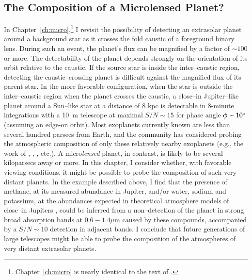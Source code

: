 \subsection[The Composition of a Microlensed Planet?]{The Composition of a Microlensed Planet?}
\label{intro_ssec:micro}
In Chapter~\ref{ch:micro},\footnote{Chapter~\ref{ch:micro} is nearly
identical to the text of \citet{spiegel_et_al2005}.} I revisit the
possibility of detecting an extrasolar planet around a background star
as it crosses the fold caustic of a foreground binary lens.  During
such an event, the planet's flux can be magnified by a factor of $\sim
100$ or more.  The detectability of the planet depends strongly on the
orientation of its orbit relative to the caustic.  If the source star
is inside the inter--caustic region, detecting the caustic--crossing
planet is difficult against the magnified flux of its parent star.  In
the more favorable configuration, when the star is outside the
inter--caustic region when the planet crosses the caustic, a close--in
Jupiter--like planet around a Sun--like star at a distance of 8 kpc is
detectable in 8-minute integrations with a 10~m telescope at maximal
$S/N\sim15$ for phase angle $\phi\sim10\mbox{$^\circ$}$ (assuming an edge-on
orbit).  Most exoplanets currently known are less than several hundred
parsecs from Earth, and the community has considered probing the
atmospheric composition of only these relatively nearby exoplanets
(e.g., the work of \citet{brown2001}, \citet{charbonneau_et_al2002},
\citet{grillmair_et_al2007}, etc.).  A micro{\it lensed} planet, in
contrast, is likely to be several kiloparsecs away or more.  In this
chapter, I consider whether, with favorable viewing conditions, it
might be possible to probe the composition of such very distant
planets.  In the example described above, I find that the presence of
methane, at its measured abundance in Jupiter, and/or water, sodium
and potassium, at the abundances expected in theoretical atmosphere
models of close--in Jupiters
\citep{sudarsky_et_al2000,sudarsky_et_al2003}, could be inferred from
a non--detection of the planet in strong broad absorption bands at
$0.6-1.4\mu$m caused by these compounds, accompanied by a $S/N\sim 10$
detection in adjacent bands.  I conclude that future generations of
large telescopes might be able to probe the composition of the
atmospheres of very distant extrasolar planets.

